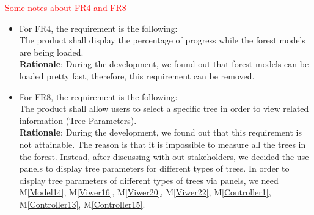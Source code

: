 \documentclass[12pt, titlepage]{article}
\newcommand{\mref}[1]{M\ref{#1}}
\begin{document}
\textcolor{red}{Some notes about FR4 and FR8}
\begin{itemize}
\item For FR4, the requirement is the following:\\
 	The product shall display the percentage of progress while the forest models are being
 	 loaded. \\
	\textbf{Rationale}: 
	 During the development, we found out that forest models can be loaded pretty fast,
	 therefore, this requirement can be removed.

\item For FR8, the requirement is the following:\\
	The product shall allow users to select a specific tree in order to view related
	 information (Tree Parameters).\\
	\textbf{Rationale}: 
	  During the development, we found out that this requirement is not attainable. The 
	  reason is that it is impossible to measure all the trees in the forest. Instead, after
	  discussing with out stakeholders, we decided the use panels to display tree parameters
	  for different types of trees. In order to display tree parameters of different types
	  of trees via panels, we need \mref{Model14}, \mref{Viwer16}, \mref{Viwer20}, 
	  \mref{Viwer22}, \mref{Controller1}, \mref{Controller13}, \mref{Controller15}.
\end{itemize}

\newpage

\newcommand{\ALLM}{All the modules (Please check Table \ref{TblModels}, \ref{TblViewers1}, 
\ref{TblViewers2}, and \ref{TblControllers}).}

\newcommand{\ALLMM}{All the Model modules (Please check Table \ref{TblModels}).}

\newcommand{\ALLVM}{All the Viewer modules (Please check Table \ref{TblViewers1},
 \ref{TblViewers2}).}
 
\newcommand{\ALLCM}{All the Controller modules (Please check Table \ref{TblControllers}).}
\end{document}
